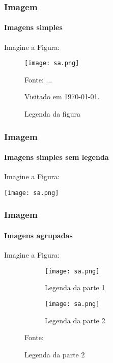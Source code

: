 	\begin{frame}
		\frametitle{Imagem}
		\framesubtitle{Imagens simples}
		Imagine a Figura:
		
		\begin{figure}
			\centering
			\caption{Legenda da figura}
			
			\texttt{[image: sa.png]} 
			
			\footnotesize{Fonte: ...	
				\par Visitado em \today.}
			\label{im1}
		\end{figure}	
	\end{frame}
	
	\begin{frame}
		\frametitle{Imagem}
		\framesubtitle{Imagens simples sem legenda}
			Imagine a Figura:
		
			\center
			\texttt{[image: sa.png]} 	
	\end{frame}
	
	\begin{frame}
		\frametitle{Imagem}
		\framesubtitle{Imagens agrupadas}
		Imagine a Figura:
		
		\begin{figure}[H]
			\centering
			\caption{Legenda da figura}
			\begin{subfigure}{0.45\textwidth}
				\centering
				\texttt{[image: sa.png]}
				\caption{Legenda da parte 1}
				\label{figPt1}
			\end{subfigure}
			\hfill
			\begin{subfigure}{0.45\textwidth}
				\centering
				\texttt{[image: sa.png]}
				\caption{Legenda da parte 2}
				\label{figPt2}
			\end{subfigure}                                                   
			
			\footnotesize{Fonte: \citeonline{tanebaun2010}}
			\label{figPt1e2}
		\end{figure}	
	\end{frame}
	
